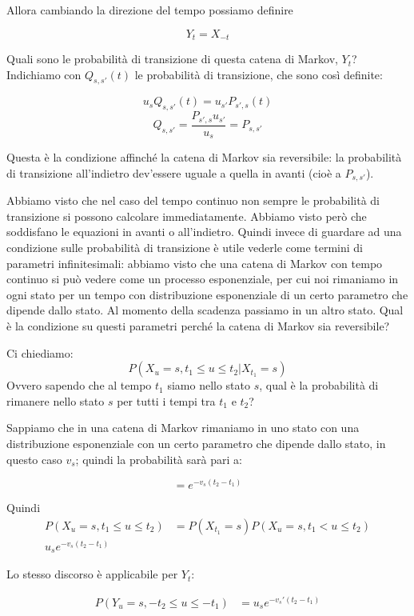 \documentclass[a4paper,12pt]{book}
\begin{document}
Allora cambiando la direzione del tempo possiamo definire 

$$ Y_t = X_{-t} $$

Quali sono le probabilità di transizione di questa catena di Markov, $ Y_t $? Indichiamo con $ Q_{s,s'}(t) $ le probabilità di transizione, che sono così definite:

$$ u_s Q_{s,s'}(t) = u_{s'} P_{s',s}(t)$$
$$ Q_{s,s'} = \frac{P_{s',s} u_{s'}}{u_s} = P_{s,s'}$$

Questa è la condizione affinché la catena di Markov sia reversibile: la probabilità di transizione all'indietro dev'essere uguale a quella in avanti (cioè a $ P_{s,s'} $).

Abbiamo visto che nel caso del tempo continuo non sempre le probabilità di transizione si possono calcolare immediatamente. Abbiamo visto però che soddisfano le equazioni in avanti o all'indietro. Quindi invece di guardare ad una condizione sulle probabilità di transizione è utile vederle come termini di parametri infinitesimali: abbiamo visto che una catena di Markov con tempo continuo si può vedere come un processo esponenziale, per cui noi rimaniamo in ogni stato per un tempo con distribuzione esponenziale di un certo parametro che dipende dallo stato. Al momento della scadenza passiamo in un altro stato. Qual è la condizione su questi parametri perché la catena di Markov sia reversibile?

Ci chiediamo:
$$ P(X_u = s, t_1 \le u \le t_2 | X_{t_1} = s) $$
Ovvero sapendo che al tempo $ t_1 $ siamo nello stato $ s $, qual è la probabilità di rimanere nello stato $ s $ per tutti i tempi tra $ t_1 $ e $ t_2 $?

Sappiamo che in una catena di Markov rimaniamo in uno stato con una distribuzione esponenziale con un certo parametro che dipende dallo stato, in questo caso $ v_s $; quindi la probabilità sarà pari a:

$$ = e^{-v_s(t_2 - t_1)}$$

Quindi 
\begin{align*}
	P(X_ u= s, t_1 \le u \le t_2) & = P (X_{t_1} = s) P(X_u = s, t_1 < u \le t_2) \\
	u_s e^{-v_s(t_2 - t_1)}
\end{align*}

Lo stesso discorso è applicabile per $ Y_t $:

\begin{align*}
	P(Y_u = s, -t_2 \le u \le -t_1) & = u_s e^{-v_s'(t_2 - t_1)}
\end{align*}
\end{document}
